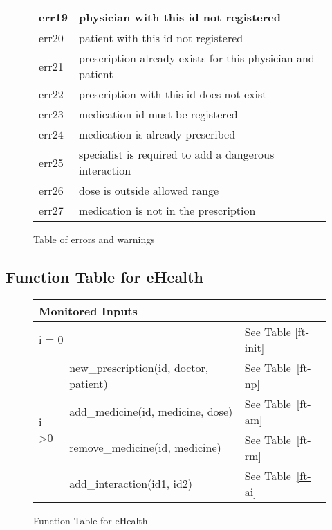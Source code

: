 \begin{figure}[]
\begin{center}
\begin{tabular}{|l|l|}
err19 & physician with this id not registered                      \\ \hline
err20 & patient with this id not registered                        \\ \hline
err21 & prescription already exists for this physician and patient \\ \hline
err22 & prescription with this id does not exist                   \\ \hline
err23 & medication id must be registered                           \\ \hline
err24 & medication is already prescribed                           \\ \hline
err25 & specialist is required to add a dangerous interaction      \\ \hline
err26 & dose is outside allowed range                              \\ \hline
err27 & medication is not in the prescription                      \\ \hline
\end{tabular}
\caption{Table of errors and warnings}
\label{err-table}
\end{center}
\end{figure}

\newpage

\subsection{Function Table for eHealth}
\begin{figure}[h]
\begin{center}
\begin{tabular}{|l|l|l|}
\hline
\multicolumn{2}{|l|}{Monitored Inputs}                &             \\ \hline
\multicolumn{2}{|l|}{i = 0}                           & See Table \ref{ft-init} \\ \hline
\multirow{4}{*}{i \textgreater 0} & new\_prescription(id, doctor, patient) & See Table~\ref{ft-np} \\ \cline{2-3} 
                                  & add\_medicine(id, medicine, dose)     & See Table~\ref{ft-am} \\ \cline{2-3} 
                                  & remove\_medicine(id, medicine) & See Table~\ref{ft-rm} \\ \cline{2-3} 
                                  & add\_interaction(id1, id2)  & See Table~\ref{ft-ai} \\ \hline
\end{tabular}
\caption{Function Table for eHealth}
\label{ft-ehealth}
\end{center}
\end{figure}


